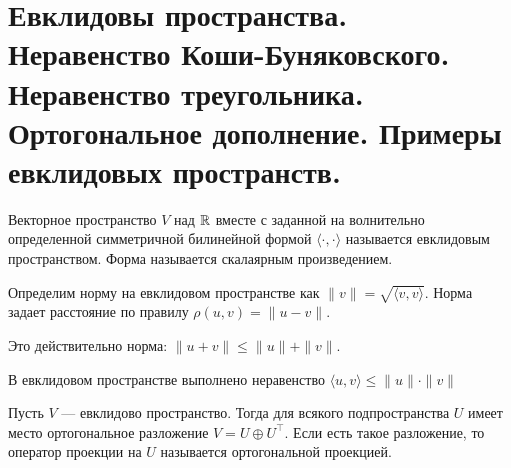 \section{Евклидовы пространства. Неравенство Коши-Буняковского. Неравенство треугольника. Ортогональное дополнение. Примеры евклидовых пространств.}
\begin{defn}
Векторное пространство $ V$ над $ \mathbb{R}$ вместе с заданной на волнительно определенной симметричной билинейной формой  $ \langle \cdot , \cdot  \rangle$ называется {\sf евклидовым пространством}. Форма называется {\sf скалаярным произведением}.  
\end{defn}

\begin{defn}[Норма]
    Определим норму на евклидовом пространстве как $ \| v \| = \sqrt{ \langle v, v \rangle} $. Норма задает расстояние по правилу $ \rho(u, v) = \| u-v \| $.
    \begin{note}
        Это действительно норма: $ \|  u + v \| \le  \|  u \| + \| v \| $.
    \end{note}
\end{defn}
\begin{lm}
    В евклидовом пространстве выполнено неравенство $ \langle u, v \rangle \le \| u \| \cdot \| v \| $
\end{lm}

\begin{lm}
Пусть $ V$ --- евклидово пространство. Тогда для всякого подпространства $ U$ имеет место ортогональное разложение  $ V = U \oplus U^{\top}$. Если есть такое разложение, то оператор проекции на $ U$ называется {\sf ортогональной проекцией}.
\end{lm}

